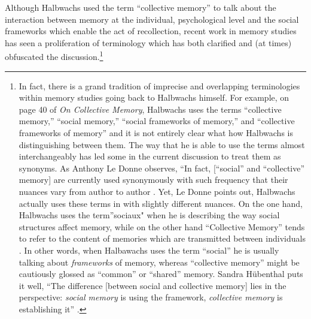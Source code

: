 Although Halbwachs used the term ``collective memory'' to talk about the
interaction between memory at the individual, psychological level and
the social frameworks which enable the act of recollection, recent work
in memory studies has seen a proliferation of terminology which has both
clarified and (at times) obfuscated the discussion.\footnote{In fact,
  there is a grand tradition of imprecise and overlapping terminologies
  within memory studies going back to Halbwachs himself. For example, on
  page 40 of \emph{On Collective Memory}, Halbwachs uses the terms
  ``collective memory,'' ``social memory,'' ``social frameworks of
  memory,'' and ``collective frameworks of memory'' and it is not
  entirely clear what how Halbwachs is distinguishing between them. The
  way that he is able to use the terms almost interchangeably has led
  some in the current discussion to treat them as synonyms. As Anthony
  Le Donne observes, ``In fact, {[}``social'' and ``collective''
  memory{]} are currently used synonymously with such frequency that
  their nuances vary from author to author \autocite[42
  n.8]{ledonne2009}. Yet, Le Donne points out, Halbwachs actually uses
  these terms in with slightly different nuances. On the one hand,
  Halbwachs uses the term''sociaux" when he is describing the way social
  structures affect memory, while on the other hand ``Collective
  Memory'' tends to refer to the content of memories which are
  transmitted between individuals \autocite[42 n.8]{ledonne2009}. In
  other words, when Halbawachs uses the term ``social'' he is usually
  talking about \emph{frameworks} of memory, whereas ``collective
  memory'' might be cautiously glossed as ``common'' or ``shared''
  memory. Sandra Hübenthal puts it well, ``The difference {[}between
  social and collective memory{]} lies in the perspective: \emph{social
  memory} is using the framework, \emph{collective memory} is
  establishing it'' \autocite[180]{hubenthal_carstens-hasselbalch2012}.}

